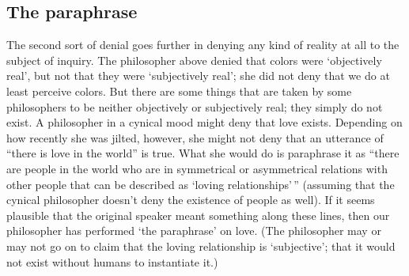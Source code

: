 \documentclass[11pt]{article}
\begin{document}
\begin{spacing}{1.5}
\subsection{The paraphrase}
\label{paraphrase}
The second sort of denial goes further in denying any kind of reality at all to the subject of inquiry. The philosopher above denied that colors were `objectively real', but not that they were `subjectively real'; she did not deny that we do at least perceive colors. But there are some things that are taken by some philosophers to be neither objectively or subjectively real; they simply do not exist. A philosopher in a cynical mood might deny that love exists. Depending on how recently she was jilted, however, she might not deny that an utterance of ``there is love in the world'' is true. What she would do is paraphrase it as ``there are people in the world who are in symmetrical or asymmetrical relations with other people that can be described as `loving relationships'\,'' (assuming that the cynical philosopher doesn't deny the existence of people as well). If it seems plausible that the original speaker meant something along these lines, then our philosopher has performed `the paraphrase' on love. (The philosopher may or may not go on to claim that the loving relationship is `subjective'; that it would not exist without humans to instantiate it.)


\end{spacing}
\end{document}
